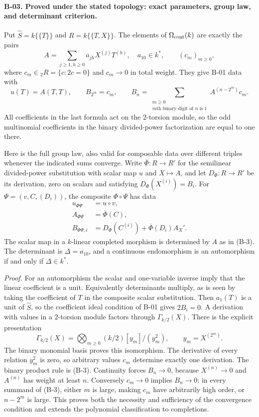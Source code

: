 \paragraph{B-03. Proved under the stated topology: exact parameters,
group law, and determinant criterion.}
Put $\widehat S=k\{\{T\}\}$ and $R=k\{\{T,X\}\}$. The elements of
$\Omega_{\rm cont}(k)$ are exactly the pairs
\[
 A=\sum_{j\geq1,h\geq0}a_{jh}X^{(j)}T^{(h)},\quad a_{10}\in k^*,
 \qquad (c_m)_{m\geq0},
 \tag{B-2}
\]
where $c_m\in {}_2R=\{c:2c=0\}$ and $c_m\to0$ in total weight.
They give B-01 data with
\[
 u(T)=A(T,T),\qquad B_{2^m}=c_m,
 \qquad B_n=\sum_{\substack{m\geq0\\\text{$m$th binary digit of $n$ is }1}}
                  A^{(n-2^m)}c_m.
 \tag{B-3}
\]
All coefficients in the last formula act on the $2$-torsion module,
so the odd multinomial coefficients in the binary divided-power
factorization are equal to one there.

Here is the full group law, also valid for composable data over
different triples whenever the indicated sums converge. Write
$\overline\Phi:R\to R'$ for the semilinear divided-power substitution
with scalar map $u$ and $X\mapsto A$, and let
$D_\Phi:R\to R'$ be its derivation, zero on scalars and satisfying
$D_\Phi(X^{(i)})=B_i$. For $\Psi=(v,C,(D_i))$, the composite
$\Phi\circ\Psi$ has data
\begin{align*}
 u_{\Phi\Psi}&=u\circ v,\\
 A_{\Phi\Psi}&=\overline\Phi(C),\\
 B_{\Phi\Psi,i}&=D_\Phi(C^{(i)})+
                  \overline\Phi(D_i)A_X'.
 \tag{B-4}
\end{align*}
The scalar map in a $k$-linear completed morphism is determined by
$A$ as in (B-3). The determinant is $\Delta=a_{10}$, and a continuous
endomorphism is an automorphism if and only if $\Delta\in k^*$.

\emph{Proof.}
For an automorphism the scalar and one-variable inverse imply that
the linear coefficient is a unit. Equivalently determinants multiply,
as is seen by taking the coefficient of $T$ in the composite scalar
substitution. Then $a_1(T)$ is a unit of $\widehat S$, so the coefficient
ideal condition of B-01 gives $2B_i=0$.
A derivation with values in a $2$-torsion module factors through
$\Gamma_{k/2}(X)$. There is the explicit presentation
\[
 \Gamma_{k/2}(X)=\bigotimes_{m\geq0}
       (k/2)[y_m]/(y_m^2),\qquad y_m=X^{(2^m)}.
\]
The binary monomial basis proves this isomorphism. The derivative
of every relation $y_m^2$ is zero, so arbitrary values $c_m$ determine
exactly one derivation. The binary product rule is (B-3).
Continuity forces $B_n\to0$, because $X^{(n)}\to0$ and
$A^{(n)}$ has weight at least $n$. Conversely $c_m\to0$ implies
$B_n\to0$: in every summand of (B-3), either $m$ is large, making
$c_m$ have arbitrarily high order, or $n-2^m$ is large.
This proves both the necessity and sufficiency of the convergence
condition and extends the polynomial classification to completions.

